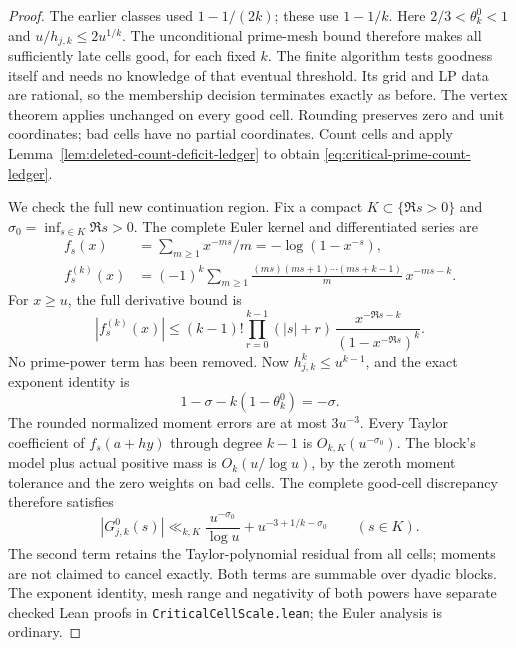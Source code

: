 \documentclass[11pt]{article}
\theoremstyle{definition}
\begin{document}
\begin{proof}
The earlier classes used $1-1/(2k)$; these use $1-1/k$.
Here $2/3<\theta_k^0<1$ and $u/h_{j,k}\le2u^{1/k}$.
The unconditional prime-mesh bound therefore makes all
sufficiently late cells good, for each fixed $k$.
The finite algorithm tests goodness itself and needs no
knowledge of that eventual threshold.
Its grid and LP data are rational, so the membership
decision terminates exactly as before.
The vertex theorem applies unchanged on every good cell.
Rounding preserves zero and unit coordinates; bad cells
have no partial coordinates. Count cells and apply
Lemma~\ref{lem:deleted-count-deficit-ledger} to obtain
\eqref{eq:critical-prime-count-ledger}.

We check the full new continuation region.
Fix a compact $K\subset\{\Re s>0\}$ and
$\sigma_0=\inf_{s\in K}\Re s>0$.
The complete Euler kernel and differentiated series are
\[
 \begin{aligned}
 f_s(x)&=\sum_{m\ge1}x^{-ms}/m=-\log(1-x^{-s}),\\
 f_s^{(k)}(x)&=(-1)^k\sum_{m\ge1}
     \frac{(ms)(ms+1)\cdots(ms+k-1)}m\,x^{-ms-k}.
 \end{aligned}
\]
For $x\ge u$, the full derivative bound is
\[
 |f_s^{(k)}(x)|\le
 (k-1)!\prod_{r=0}^{k-1}(|s|+r)\,
             \frac{x^{-\Re s-k}}{(1-x^{-\Re s})^k}.
\]
No prime-power term has been removed. Now $h_{j,k}^k\le u^{k-1}$,
and the exact exponent identity is
\begin{equation}
 1-\sigma-k(1-\theta_k^0)=-\sigma .
 \label{eq:critical-prime-remainder-exponent}
\end{equation}
The rounded normalized moment errors are at most $3u^{-3}$.
Every Taylor coefficient of $f_s(a+hy)$ through degree $k-1$
is $O_{k,K}(u^{-\sigma_0})$.
The block's model plus actual positive mass is
$O_k(u/\log u)$, by the zeroth moment tolerance and the
zero weights on bad cells. The complete good-cell discrepancy
therefore satisfies
\begin{equation}
 |G^0_{j,k}(s)|\ll_{k,K}
       \frac{u^{-\sigma_0}}{\log u}
                       +u^{-3+1/k-\sigma_0}\qquad(s\in K).
 \label{eq:critical-prime-full-error}
\end{equation}
The second term retains the Taylor-polynomial residual
from all cells; moments are not claimed to cancel exactly.
Both terms are summable over dyadic blocks.
The exponent identity, mesh range and negativity of both
powers have separate checked Lean proofs in
\texttt{CriticalCellScale.lean}; the Euler analysis is ordinary.


\end{proof}
\end{document}
